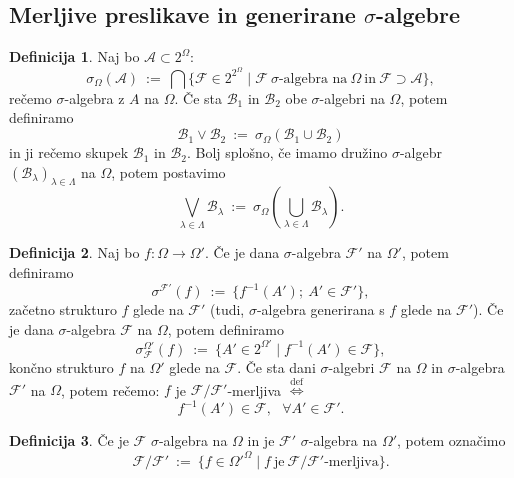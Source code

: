 \documentclass[11pt]{article}
\newcommand{\A}{\mathcal{A}}
\newcommand{\BB}{\mathcal{B}}
\newcommand{\F}{\mathcal{F}}
\newcommand{\diff}{\overset{\text{def}}{\iff}}
\newcommand{\set}[1]{\{#1\}}
\newcommand{\oklepaj}[1]{\left(#1\right)}
\newcommand{\1}{\mathbbm{1}}
\theoremstyle{definition}
\newtheorem{definicija}{Definicija}[section]
\theoremstyle{definition}
\theoremstyle{definition}
\theoremstyle{definition}
\begin{document}
\subsection{Merljive preslikave in generirane $\sigma$-algebre}
\vspace{0.5cm}

\begin{definicija}

Naj bo $\A \subset 2^\Omega$:
$$\sigma_\Omega(\A) ~:=~ \bigcap\set{\F \in 2^{2^\Omega} \mid \F ~\sigma\text{-algebra na}~\Omega~\text{in}~\F\supset\A},$$
rečemo $\sigma$-algebra z $A$ na $\Omega$. Če sta $\BB_1$ in $\BB_2$ obe $\sigma$-algebri na $\Omega$, potem definiramo
$$\BB_1 \vee \BB_2 ~:=~ \sigma_\Omega(\BB_1 \cup \BB_2)$$
in ji rečemo skupek $\BB_1$ in $\BB_2$. Bolj splošno, če imamo družino $\sigma$-algebr $(\BB_\lambda)_{\lambda\in\Lambda}$ na $\Omega$, potem postavimo
$$\bigvee_{\lambda\in\Lambda} \BB_\lambda ~:=~ \sigma_\Omega\oklepaj{\bigcup_{\lambda\in\Lambda} \BB_\lambda}.$$

\end{definicija}
\vspace{0.5cm}

\begin{definicija}

Naj bo $f: \Omega \rightarrow \Omega'$. Če je dana $\sigma$-algebra $\F'$ na $\Omega'$, potem definiramo
$$\sigma^{\F'}(f) ~:=~ \set{f^{-1}(A'); ~A' \in \F'},$$
začetno strukturo $f$ glede na $\F'$ (tudi, $\sigma$-algebra generirana s $f$ glede na $\F'$). Če je dana $\sigma$-algebra $\F$ na $\Omega$, potem definiramo
$$\sigma_\F^{\Omega'}(f) ~:=~ \set{A' \in 2^{\Omega'} \mid f^{-1}(A') \in \F},$$
končno strukturo $f$ na $\Omega'$ glede na $\F$. Če sta dani $\sigma$-algebri $\F$ na $\Omega$ in $\sigma$-algebra $\F'$ na $\Omega$, potem rečemo: $f$ je $\F/\F'$-merljiva $\diff$
$$f^{-1}(A') \in \F, ~~~\forall A' \in \F'.$$

\end{definicija}
\vspace{0.5cm}

\begin{definicija}

Če je $\F$ $\sigma$-algebra na $\Omega$ in je $\F'$ $\sigma$-algebra na $\Omega'$, potem označimo
$$\F/\F' ~:=~ \set{f \in \Omega'^\Omega \mid f ~\text{je}~ \F/\F'\text{-merljiva}}.$$

\end{definicija}
\vspace{0.5cm}
\end{document}
